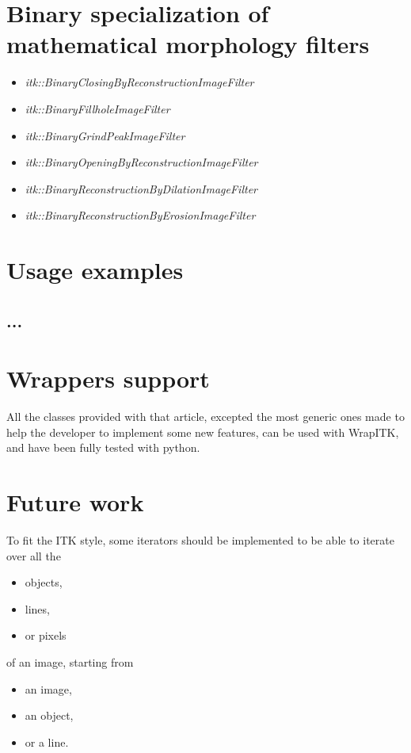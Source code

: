 \documentclass{InsightArticle}
\begin{document}
\section{Binary specialization of mathematical morphology filters}

\begin{itemize}
  \item {\em itk::BinaryClosingByReconstructionImageFilter}
  \item {\em itk::BinaryFillholeImageFilter}
  \item {\em itk::BinaryGrindPeakImageFilter}
  \item {\em itk::BinaryOpeningByReconstructionImageFilter}
  \item {\em itk::BinaryReconstructionByDilationImageFilter}
  \item {\em itk::BinaryReconstructionByErosionImageFilter}
\end{itemize}

\section{Usage examples}

\subsection{...}


\section{Wrappers support}

All the classes provided with that article, excepted the most generic ones made
to help the developer to implement some new features, can be used with WrapITK,
and have been fully tested with python.

\section{Future work}

To fit the ITK style, some iterators should be implemented to be able to iterate
over all the 
\begin{itemize}
  \item objects,
  \item lines,
  \item or pixels
\end{itemize}

of an image, starting from 
\begin{itemize}
  \item an image,
  \item an object,
  \item or a line.
\end{itemize}
\end{document}
